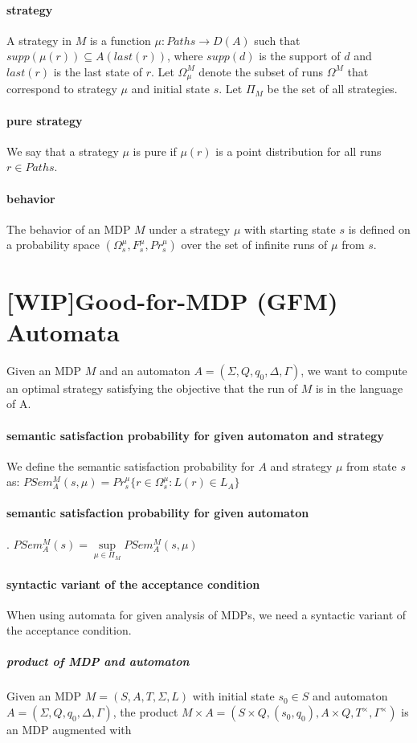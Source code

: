 \documentclass{fithesis3}
\begin{document}
		\paragraph{strategy}
		A strategy in $M$ is a
		function $\mu:Paths \rightarrow D(A)$
		such that $supp(\mu(r))\subseteq A(last(r))$,
		where $supp(d)$ is the support of $d$ and
		$last(r)$ is the last state of $r$.
		Let $\Omega^M_\mu$ denote the subset of runs $\Omega^M$
		that correspond to strategy $\mu$ and initial state $s$.
		Let $\Pi_M$ be the set of all strategies.
		\paragraph{pure strategy}
		We say that a strategy $\mu$ is pure
		if $\mu(r)$ is a point distribution for all runs $r \in Paths$.
		\paragraph{behavior}
		The behavior of an MDP $M$
		under a strategy $\mu$ with starting state $s$ is defined
		on a probability space $(\Omega_s^\mu, F_s^\mu, Pr_s^\mu)$
		over the set of infinite runs of $\mu$ from $s$.
		
		\section{[WIP]Good-for-MDP (GFM) Automata}
		Given an MDP $M$ and an
		automaton $A=(\Sigma, Q, q_0, \Delta, \Gamma)$, we want to compute an optimal strategy satisfying the objective that the run of $M$
		is in the language of A.
		\paragraph{semantic satisfaction probability for given automaton and strategy}
		We define the semantic satisfaction probability for $A$
		and strategy $\mu$ from state $s$ as:\newline
		$PSem_A^M(s,\mu)=Pr_s^\mu\{r \in\Omega_s^\mu:L(r)\in L_A  \}$
		\paragraph{semantic satisfaction probability for given automaton}
		.\newline
		$PSem_A^M(s)=\underset{\mu \in \Pi_M}{\sup} PSem_A^M(s, \mu)$
		\paragraph{syntactic variant of the acceptance condition}
		When using automata for given analysis of MDPs, we need
		a syntactic variant of the acceptance condition.
		\subparagraph{product of MDP and automaton}
		Given an MDP $M=(S,A,T,\Sigma,L)$ with initial state $s_0 \in S$
		and automaton $A = (\Sigma, Q, q_0, \Delta, \Gamma)$,
		the product $M \times A = (
		S \times Q,
		(s_0, q_0),
		A \times Q,
		T^\times,
		\Gamma^\times
		)$ is an MDP augmented with 
		
\end{document}
